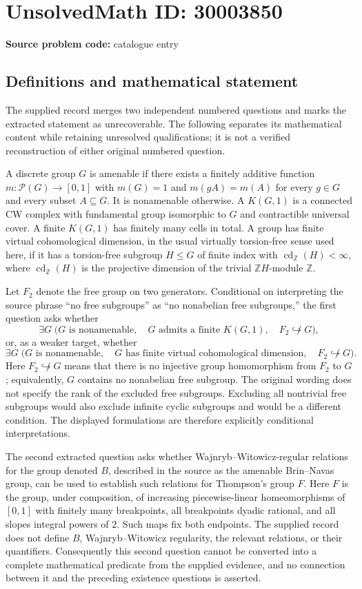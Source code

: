 \documentclass[11pt]{article}
\newcommand{\Z}{\mathbb{Z}}
\begin{document}
\section*{UnsolvedMath ID: 30003850}
\textbf{Source problem code:} catalogue entry
\subsection{Definitions and mathematical statement}
The supplied record merges two independent numbered questions and marks the extracted statement as unrecoverable. The following separates its mathematical content while retaining unresolved qualifications; it is not a verified reconstruction of either original numbered question.

A discrete group \(G\) is amenable if there exists a finitely additive function \(m:\mathcal P(G)\to[0,1]\) with \(m(G)=1\) and \(m(gA)=m(A)\) for every \(g\in G\) and every subset \(A\subseteq G\). It is nonamenable otherwise. A \(K(G,1)\) is a connected CW complex with fundamental group isomorphic to \(G\) and contractible universal cover. A finite \(K(G,1)\) has finitely many cells in total. A group has finite virtual cohomological dimension, in the usual virtually torsion-free sense used here, if it has a torsion-free subgroup \(H\leq G\) of finite index with \(\operatorname{cd}_{\Z}(H)<\infty\), where \(\operatorname{cd}_{\Z}(H)\) is the projective dimension of the trivial \(\Z H\)-module \(\Z\).

Let \(F_2\) denote the free group on two generators. Conditional on interpreting the source phrase ``no free subgroups'' as ``no nonabelian free subgroups,'' the first question asks whether
\[
\exists G\;\bigl(G\text{ is nonamenable},\quad G\text{ admits a finite }K(G,1),\quad F_2\not\hookrightarrow G\bigr),
\]
or, as a weaker target, whether
\[
\exists G\;\bigl(G\text{ is nonamenable},\quad G\text{ has finite virtual cohomological dimension},\quad F_2\not\hookrightarrow G\bigr).
\]
Here \(F_2\not\hookrightarrow G\) means that there is no injective group homomorphism from \(F_2\) to \(G\); equivalently, \(G\) contains no nonabelian free subgroup. The original wording does not specify the rank of the excluded free subgroups. Excluding all nontrivial free subgroups would also exclude infinite cyclic subgroups and would be a different condition. The displayed formulations are therefore explicitly conditional interpretations.

The second extracted question asks whether Wajnryb--Witowicz-regular relations for the group denoted \(B\), described in the source as the amenable Brin--Navas group, can be used to establish such relations for Thompson's group \(F\). Here \(F\) is the group, under composition, of increasing piecewise-linear homeomorphisms of \([0,1]\) with finitely many breakpoints, all breakpoints dyadic rational, and all slopes integral powers of \(2\). Such maps fix both endpoints. The supplied record does not define \(B\), Wajnryb--Witowicz regularity, the relevant relations, or their quantifiers. Consequently this second question cannot be converted into a complete mathematical predicate from the supplied evidence, and no connection between it and the preceding existence questions is asserted.
\end{document}
